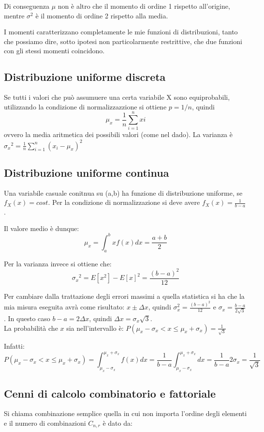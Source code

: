 \documentclass{article}
\begin{document}
Di conseguenza $\mu$ non è altro che il momento di ordine 1 rispetto all'origine, mentre $\sigma^2$ è il momento di ordine 2 rispetto alla media.

I momenti caratterizzano completamente le mie funzioni di distribuzioni, tanto che possiamo dire, sotto ipotesi non particolarmente restrittive, che due funzioni con gli stessi momenti coincidono.


\subsection{Distribuzione uniforme discreta}
Se tutti i valori che può assumuere una certa variabile X sono equiprobabili, utilizzando la condizione di normalizzazzione si ottiene $p=1/n$, quindi
\[
\mu_x=\frac{1}{n}\sum_{i=1}^{n}xi
\]
ovvero la media aritmetica dei possibili valori (come nel dado). La varianza è
${\sigma_x}^2=\frac{1}{n} \sum_{i=1}^{n}(x_i-\mu_x)^2$

\subsection{Distribuzione uniforme continua}
Una variabile casuale conitnua su (a,b) ha funzione di distribuzione uniforme, se $f_X(x)=cost$.
Per la condizione di normalizzazione si deve avere $f_X(x)=\frac{1}{b-a}$.

Il valore medio è dunque:
\[
\mu_x=\int_{a}^{b}x f(x) dx = \frac{a+b}{2}
\]

Per la varianza invece si ottiene che:
\[
{\sigma_x}^2=E[x^2]-{E[x]}^2=\frac{{(b-a)^2}}{12}
\]




\begin{nota}
    Per cambiare dalla trattazione degli errori massimi a quella statistica si ha che la mia misura eseguita avrà come risultato: $x \pm \Delta x$,  quindi $\sigma_x^2=\frac{(b-a)^2}{12}$ e $\sigma_x=\frac{b-a}{2\sqrt{3}}$. In questo caso $b-a = 2\Delta x$, quindi $\Delta x = \sigma_x \sqrt{3}$. \\
    La probabilità che $x$ sia nell'intervallo è: $P(\mu_x-\sigma_x < x \leq \mu_x + \sigma_x)=\frac{1}{\sqrt{3}}$

    Infatti:
    \[
    P(\mu_x-\sigma_x < x \leq \mu_x + \sigma_x)= \int_{\mu_x-\sigma_x}^{\mu_x+\sigma_x} f(x)dx = \frac{1}{b-a}\int_{\mu_x-\sigma_x}^{\mu_x+\sigma_x} dx = \frac{1}{b-a} 2 \sigma_x = \frac{1}{\sqrt{3}}
    \]

\end{nota}
\subsection{Cenni di calcolo combinatorio e fattoriale}
Si chiama combinazione semplice quella in cui non importa l'ordine degli elementi e il numero di combinazioni $C_{n,r}$ è dato da:
\end{document}
